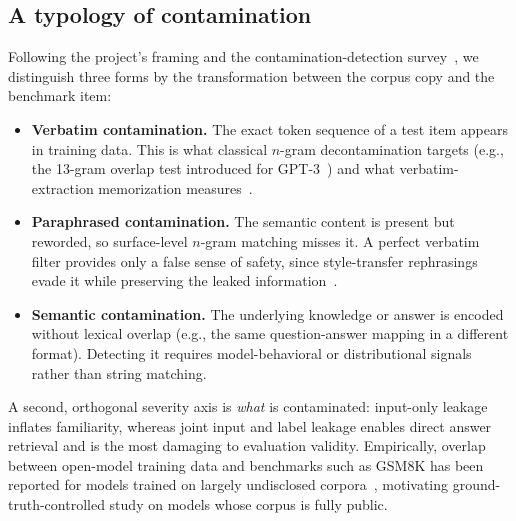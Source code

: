 \subsection{A typology of contamination}
Following the project's framing and the contamination-detection
survey~\citep{ravaut2024survey}, we distinguish three forms by the transformation
between the corpus copy and the benchmark item:
\begin{itemize}
 \item \textbf{Verbatim contamination.} The exact token sequence of a test item
 appears in training data. This is what classical $n$-gram decontamination targets
 (e.g., the 13-gram overlap test introduced for GPT-3~\citep{brown2020gpt3}) and what
 verbatim-extraction memorization measures~\citep{carlini2023quantifying}.
 \item \textbf{Paraphrased contamination.} The semantic content is present but
 reworded, so surface-level $n$-gram matching misses it. A perfect verbatim filter
 provides only a false sense of safety, since style-transfer rephrasings evade it
 while preserving the leaked information~\citep{ippolito2023verbatim}.
 \item \textbf{Semantic contamination.} The underlying knowledge or answer is encoded
 without lexical overlap (e.g., the same question-answer mapping in a different
 format). Detecting it requires model-behavioral or distributional signals rather than
 string matching.
\end{itemize}
A second, orthogonal severity axis is \emph{what} is contaminated: input-only leakage
inflates familiarity, whereas joint input and label leakage enables direct answer
retrieval and is the most damaging to evaluation validity. Empirically, overlap between
open-model training data and benchmarks such as GSM8K has been reported for models
trained on largely undisclosed corpora~\citep{touvron2023llama}, motivating
ground-truth-controlled study on models whose corpus is fully public.

